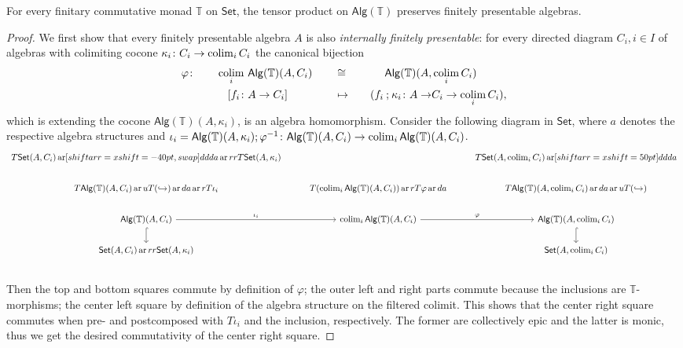 \documentclass[a4paper, UKenglish, numberwithinsect, thm-restate, cleveref, final]{lipics-v2021}
\theoremstyle{plain}
\theoremstyle{definition}
\newcommand{\T}{\ensuremath{\mathbb{T}}\xspace}
\newcommand{\seq}{\ensuremath{\mathbin{\text{\upshape;}}}}
\newcommand{\Alg}{\ensuremath{\mathsf{Alg}}}
\newcommand{\Set}{\ensuremath{\mathsf{Set}}\xspace}
\def\colim{\qopname\relax m{colim}}
\def\colim{\qopname\relax m{colim}}
\DeclareMathOperator{\ar}{ar}
\newcommand{\incl}{\hookrightarrow}
\numberwithin{equation}{section}
\begin{document}
\begin{proposition}\label{prop:tensor-pres-fp}
  For every finitary commutative monad \(\T\) on \Set, the tensor product on $\Alg(\T)$ preserves finitely presentable algebras.
\end{proposition}
\begin{proof}
  We first show that every finitely presentable algebra \(A\) is also \emph{internally finitely presentable}:
  for every directed diagram \(C_{i}, i \in I\) of algebras with colimiting cocone \(\kappa_{i} \colon C_{i} \rightarrow \colim_{i}C_{i}\) the canonical bijection
  \begin{alignat*}{4}
    \varphi \colon&\quad&  \colim_{i}\,\, & \Alg(\T)(A, C_{i}) &\quad&\cong &\quad \Alg(\T)(A, & \colim_{i} C_{i})\\
     &&[f_{i} \colon & A \rightarrow C_{i}] &\quad &\mapsto &\quad ( f_{i} \seq \kappa_{i} \colon A \rightarrow & C_{i} \rightarrow \colim_{i}C_{i}),
  \end{alignat*}
  which is extending the cocone \(\Alg(\T)(A, \kappa_{i})\), is an algebra homomorphism. Consider the following diagram in \Set,
  where \(a\) denotes the respective algebra structures and \(\iota_{i} = \Alg(\T)(A, \kappa_{i}) ; \varphi^{-1} \colon \Alg(\T)(A, C_{i}) \rightarrow \colim_{i} \Alg(\T)(A, C_{i})\).
  \[
    \begin{tikzcd}
      T \Set(A, C_{i}) \ar[shiftarr={xshift=-40pt}, swap]{ddd}{a} \ar{rr}{T \Set(A, \kappa_{i})} & & T \Set(A, \colim_{i} C_{i}) \ar[shiftarr={xshift=50pt}]{ddd}{a}  \\
      T \Alg(\T)(A, C_{i}) \ar{u}{T(\incl)} \ar{d}{a}  \ar{r}{T \iota_{i}} & T(\colim_{i} \Alg(\T)(A, C_{i})) \ar{r}{T \varphi}  \ar{d}{a} & T \Alg(\T)(A, \colim_{i} C_{i}) \ar{d}{a} \ar{u}{T (\incl)}   \\
      \Alg(\T)(A, C_{i}) \dar[hook]{} \rar{\iota_{i}} & \colim_{i} \Alg(\T)(A, C_{i}) \rar{\varphi} & \Alg(\T)(A, \colim_{i} C_{i}) \dar[hook]{}    \\
      \Set(A, C_{i}) \ar{rr}{\Set(A, \kappa_{i})} & & \Set(A, \colim_{i} C_{i})  \\
    \end{tikzcd}
  \]
  Then the top and bottom squares commute by definition of \(\varphi\);
  the outer left  and right parts commute because the inclusions are \T-morphisms;
  the center left square by definition of the algebra structure on the filtered colimit.
  This shows that the center right square commutes when pre- and postcomposed with \(T\iota_{i}\) and the inclusion, respectively.
  The former are collectively epic and the latter is monic, thus we get the desired commutativity of the center right square.


\end{proof}
\end{document}
